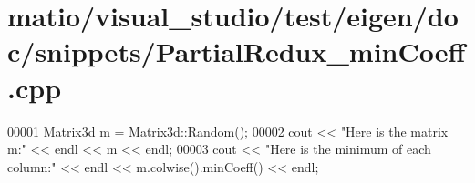 \hypertarget{matio_2visual__studio_2test_2eigen_2doc_2snippets_2_partial_redux__min_coeff_8cpp_source}{}\section{matio/visual\+\_\+studio/test/eigen/doc/snippets/\+Partial\+Redux\+\_\+min\+Coeff.cpp}
\label{matio_2visual__studio_2test_2eigen_2doc_2snippets_2_partial_redux__min_coeff_8cpp_source}

\begin{DoxyCode}
00001 Matrix3d m = Matrix3d::Random();
00002 cout << \textcolor{stringliteral}{"Here is the matrix m:"} << endl << m << endl;
00003 cout << \textcolor{stringliteral}{"Here is the minimum of each column:"} << endl << m.colwise().minCoeff() << endl;
\end{DoxyCode}
